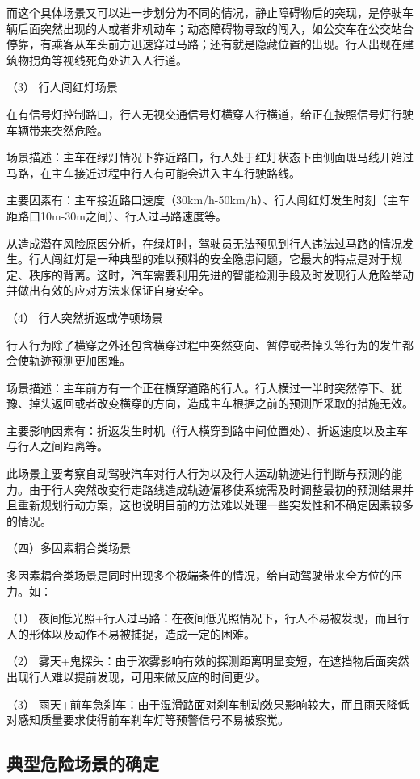 而这个具体场景又可以进一步划分为不同的情况，静止障碍物后的突现，是停驶车辆后面突然出现的人或者非机动车；动态障碍物导致的闯入，如公交车在公交站台停靠，有乘客从车头前方迅速穿过马路；还有就是隐藏位置的出现。行人出现在建筑物拐角等视线死角处进入人行道。

（3） 行人闯红灯场景

在有信号灯控制路口，行人无视交通信号灯横穿人行横道，给正在按照信号灯行驶车辆带来突然危险。

场景描述：主车在绿灯情况下靠近路口，行人处于红灯状态下由侧面斑马线开始过马路，在主车接近过程中行人有可能会进入主车行驶路线。

主要因素有：主车接近路口速度（30km/h-50km/h）、行人闯红灯发生时刻（主车距路口10m-30m之间）、行人过马路速度等。

从造成潜在风险原因分析，在绿灯时，驾驶员无法预见到行人违法过马路的情况发生。行人闯红灯是一种典型的难以预料的安全隐患问题，它最大的特点是对于规定、秩序的背离。这时，汽车需要利用先进的智能检测手段及时发现行人危险举动并做出有效的应对方法来保证自身安全。

（4） 行人突然折返或停顿场景

行人行为除了横穿之外还包含横穿过程中突然变向、暂停或者掉头等行为的发生都会使轨迹预测更加困难。

场景描述：主车前方有一个正在横穿道路的行人。行人横过一半时突然停下、犹豫、掉头返回或者改变横穿的方向，造成主车根据之前的预测所采取的措施无效。

主要影响因素有：折返发生时机（行人横穿到路中间位置处）、折返速度以及主车与行人之间距离等。

此场景主要考察自动驾驶汽车对行人行为以及行人运动轨迹进行判断与预测的能力。由于行人突然改变行走路线造成轨迹偏移使系统需及时调整最初的预测结果并且重新规划行动方案，这也说明目前的方法难以处理一些突发性和不确定因素较多的情况。

（四）多因素耦合类场景

多因素耦合类场景是同时出现多个极端条件的情况，给自动驾驶带来全方位的压力。如：

（1） 夜间低光照+行人过马路：在夜间低光照情况下，行人不易被发现，而且行人的形体以及动作不易被捕捉，造成一定的困难。

（2） 雾天+鬼探头：由于浓雾影响有效的探测距离明显变短，在遮挡物后面突然出现行人难以提前发现，可用来做反应的时间更少。

（3） 雨天+前车急刹车：由于湿滑路面对刹车制动效果影响较大，而且雨天降低对感知质量要求使得前车刹车灯等预警信号不易被察觉。



\subsection{典型危险场景的确定}

